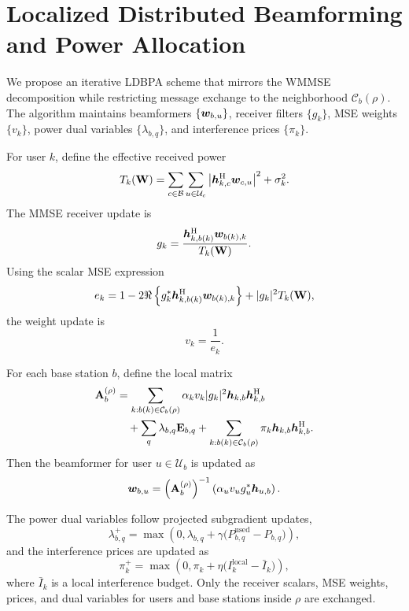 \section{Localized Distributed Beamforming and Power Allocation}

We propose an iterative LDBPA scheme that mirrors the WMMSE decomposition while restricting message exchange to the neighborhood $\mathcal{C}_b(\rho)$. The algorithm maintains beamformers $\{\boldsymbol{w}_{b,u}\}$, receiver filters $\{g_k\}$, MSE weights $\{v_k\}$, power dual variables $\{\lambda_{b,q}\}$, and interference prices $\{\pi_k\}$.

For user $k$, define the effective received power
\begin{equation}
T_k(\mathbf{W}) = \sum_{c \in \mathcal{B}} \sum_{u \in \mathcal{U}_c}
\left| \boldsymbol{h}_{k,c}^{\mathrm{H}} \boldsymbol{w}_{c,u} \right|^2 + \sigma_k^2.
\end{equation}
The MMSE receiver update is
\begin{equation}
g_k =
\frac{\boldsymbol{h}_{k,b(k)}^{\mathrm{H}} \boldsymbol{w}_{b(k),k}}
{T_k(\mathbf{W})}.
\end{equation}
Using the scalar MSE expression
\begin{equation}
e_k = 1 - 2 \Re \left\{ g_k^{*}\boldsymbol{h}_{k,b(k)}^{\mathrm{H}} \boldsymbol{w}_{b(k),k} \right\}
+ |g_k|^2 T_k(\mathbf{W}),
\end{equation}
the weight update is
\begin{equation}
v_k = \frac{1}{e_k}.
\end{equation}

For each base station $b$, define the local matrix
\begin{align}
\mathbf{A}_b^{(\rho)} &=
\sum_{k : b(k) \in \mathcal{C}_b(\rho)}
\alpha_k v_k |g_k|^2 \boldsymbol{h}_{k,b} \boldsymbol{h}_{k,b}^{\mathrm{H}} \nonumber \\
&\quad + \sum_q \lambda_{b,q} \mathbf{E}_{b,q}
+ \sum_{k : b(k) \in \mathcal{C}_b(\rho)} \pi_k \boldsymbol{h}_{k,b} \boldsymbol{h}_{k,b}^{\mathrm{H}}.
\label{eq:Ab}
\end{align}
Then the beamformer for user $u \in \mathcal{U}_b$ is updated as
\begin{equation}
\boldsymbol{w}_{b,u} = \left(\mathbf{A}_b^{(\rho)}\right)^{-1}
\left(\alpha_u v_u g_u^{*} \boldsymbol{h}_{u,b}\right).
\label{eq:beamformer_update}
\end{equation}

The power dual variables follow projected subgradient updates,
\begin{equation}
\lambda_{b,q}^{+} =
\max \left(0, \lambda_{b,q} + \gamma \bigl(P_{b,q}^{\mathrm{used}} - P_{b,q}\bigr)\right),
\end{equation}
and the interference prices are updated as
\begin{equation}
\pi_k^{+} =
\max \left(0, \pi_k + \eta \bigl(I_k^{\mathrm{local}} - \bar{I}_k\bigr)\right),
\end{equation}
where $\bar{I}_k$ is a local interference budget. Only the receiver scalars, MSE weights, prices, and dual variables for users and base stations inside $\rho$ are exchanged.


